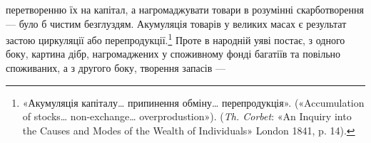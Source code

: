 перетворенню їх на капітал, а нагромаджувати товари
в розумінні скарботворення — було б чистим безглуздям.
Акумуляція товарів у великих масах є результат застою циркуляції
або перепродукції.\footnote{
«Акумуляція капіталу\dots{} припинення обміну\dots{} перепродукція».
(«Accumulation of stocks\dots{} non-exchange\dots{} overprodustion»).
(\emph{Th. Corbet}: «An Inquiry into the Causes and Modes of the Wealth of
Individuals» London 1841, p. 14).
} Проте в народній уяві постає, з одного
боку, картина дібр, нагромаджених у споживному фонді багатіїв
та повільно споживаних, а з другого боку, творення запасів —
\parbreak{}  %
